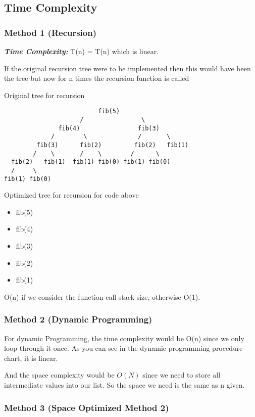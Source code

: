\documentclass[a4paper, 12pt]{article}
\begin{document}
\subsection{Time Complexity}

\subsubsection*{Method 1 (Recursion)}

\textbf{\textit{Time Complexity:}} T(n) = T(n) which is linear. 

If the original recursion tree were to be implemented then this would have been the tree but now for n times the recursion function is called

Original tree for recursion

\begin{lstlisting}
                          fib(5)   
                     /                \
               fib(4)                fib(3)   
             /        \              /       \ 
         fib(3)      fib(2)         fib(2)   fib(1)
        /    \       /    \        /      \
  fib(2)   fib(1)  fib(1) fib(0) fib(1) fib(0)
  /     \
fib(1) fib(0)
\end{lstlisting}

Optimized tree for recursion for code above

\begin{itemize}
  \item fib(5) 
  \item fib(4)
  \item fib(3)
  \item fib(2)
  \item fib(1)
\end{itemize}

O(n) if we consider the function call stack size, otherwise O(1).

\subsubsection*{Method 2 (Dynamic Programming) }

For dynamic Programming, the time complexity would be O(n) since we only loop through it once. As you can see in the dynamic programming procedure chart, it is linear.

And the space complexity would be $O(N)$ since we need to store all intermediate values into our list. So the space we need is the same as n given.

\subsubsection*{Method 3 (Space Optimized Method 2) }
\end{document}
